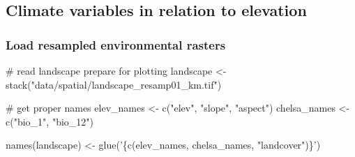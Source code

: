 \documentclass[
]{article}
\newenvironment{Shaded}{}{}
\newcommand{\CommentTok}[1]{\textcolor[rgb]{0.00,0.50,0.00}{#1}}
\newcommand{\KeywordTok}[1]{\textcolor[rgb]{0.00,0.00,1.00}{#1}}
\newcommand{\NormalTok}[1]{#1}
\newcommand{\StringTok}[1]{\textcolor[rgb]{0.00,0.50,0.50}{#1}}
\begin{document}
\hypertarget{climate-variables-in-relation-to-elevation}{%
\subsection{Climate variables in relation to elevation}\label{climate-variables-in-relation-to-elevation}}

\hypertarget{load-resampled-environmental-rasters}{%
\subsubsection{Load resampled environmental rasters}\label{load-resampled-environmental-rasters}}

\begin{Shaded}
\begin{Highlighting}[]
\CommentTok{# read landscape prepare for plotting}
\NormalTok{landscape <-}\StringTok{ }\KeywordTok{stack}\NormalTok{(}\StringTok{"data/spatial/landscape_resamp01_km.tif"}\NormalTok{)}

\CommentTok{# get proper names}
\NormalTok{elev_names <-}\StringTok{ }\KeywordTok{c}\NormalTok{(}\StringTok{"elev"}\NormalTok{, }\StringTok{"slope"}\NormalTok{, }\StringTok{"aspect"}\NormalTok{)}
\NormalTok{chelsa_names <-}\StringTok{ }\KeywordTok{c}\NormalTok{(}\StringTok{"bio_1"}\NormalTok{, }\StringTok{"bio_12"}\NormalTok{)}

\KeywordTok{names}\NormalTok{(landscape) <-}\StringTok{ }\KeywordTok{glue}\NormalTok{(}\StringTok{'\{c(elev_names, chelsa_names, "landcover")\}'}\NormalTok{)}
\end{Highlighting}
\end{Shaded}
\end{document}
